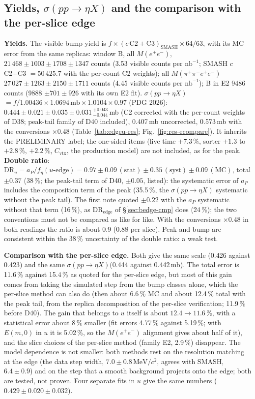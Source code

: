 \documentclass[11pt,a4paper]{article}
\newcommand{\Mfour}{\ensuremath{M(\pi^{+}\pi^{-}e^{+}e^{-})}\xspace}
\newcommand{\Mee}{\ensuremath{M(e^{+}e^{-})}\xspace}
\newcommand{\nbinv}{\ensuremath{\mathrm{nb}^{-1}}\xspace}
\newcommand{\MeVcc}{\ensuremath{\mathrm{MeV}/c^{2}}\xspace}
\newcommand{\code}[1]{\texttt{\detokenize{#1}}}
\newcommand{\aP}{\ensuremath{a_P}\xspace}
\newcommand{\sigeta}{\ensuremath{\sigma(pp\to\eta X)}\xspace}
\begin{document}
\subsection{Yields, \texorpdfstring{\sigeta}{sigma(pp -> eta X)} and the comparison with the per-slice edge}
\label{sec:edgeu-cmp}
\textbf{Yields.} The visible bump yield is $f\times(c\,\mathrm{C2}+\mathrm{C3})_{\mathrm{SMASH}}\times64/63$, with its MC error from the same
replicas: window B, all \Mee, $21\,468\pm1003\pm1708\pm1347$ counts (3.53 visible counts per \nbinv; SMASH $c$C2+C3 $=50\,425.7$ with the
per-count C2 weights); all \Mfour $27\,027\pm1263\pm2150\pm1711$ counts (4.45 visible counts per \nbinv); B in E2 9486 counts (9888 $\pm701\pm926$
with its own E2 fit). \textbf{\sigeta} $=f/1.00436\times1.0694\,\mathrm{mb}\times1.0104\times0.97$ (PDG 2026):
$0.444\pm0.021\pm0.035\pm0.031\,^{+0.043}_{-0.044}$\,mb (C2 corrected with the per-count weights of D38; peak-tail family of D40 included),
0.407\,mb uncorrected, 0.573\,mb with the conversions $\times0.48$ (Table~\ref{tab:edgeu-res}; Fig.~\ref{fig:res-ecompare}). It inherits
the PRELIMINARY label; the one-sided items (live time $+7.3$\,\%, sorter $+1.3$ to $+2.8$\,\%, \code{cor_ok} $+2.2$\,\%, $C_{\mathrm{vtx}}$, the
production model) are not included, as for the peak. \textbf{Double ratio}: $\mathrm{DR}_u=\aP/f_\eta(u\text{-edge})=0.97\pm0.09\,(\mathrm{stat})
\pm0.35\,(\mathrm{syst})\pm0.09\,(\mathrm{MC})$, total $\pm0.37$ (38\,\%; the peak-tail term of D40, $\pm0.05$, listed): the systematic error of
\aP includes the composition term of the peak (35.5\,\%, the \sigeta systematic without the peak tail). The first note quoted $\pm0.22$ with the \aP systematic without that term (16\,\%), as
$\mathrm{DR}_{\mathrm{edge}}$ of \S\ref{sec:bedge-cmp} does (24\,\%); the two conventions must not be compared as like for like. With the
conversions $\times0.48$ in both readings the ratio is about 0.9 (0.88 per slice). Peak and bump are consistent within the 38\,\% uncertainty of the double
ratio: a weak test.

\textbf{Comparison with the per-slice edge.} Both give the same scale (0.426 against 0.423) and the same \sigeta (0.444 against 0.442\,mb). The
total error is 11.6\,\% against 15.4\,\% as quoted for the per-slice edge, but most of this gain comes from taking the simulated step from the bump
classes alone, which the per-slice method can also do (then about 6.6\,\% MC and about 12.4\,\% total with the peak tail, from the replica
decomposition of the per-slice verification; 11.9\,\% before D40). The gain that belongs to $u$ itself is about $12.4\to11.6$\,\%, with a statistical error about 8\,\% smaller (fit errors 4.77\,\% against
5.19\,\%; with $E(m,0)$ in $u$ it is 5.02\,\%, so the \Mee alignment gives about half of it), and the slice choices of the per-slice method
(family E2, 2.9\,\%) disappear. The model dependence is not smaller: both methods rest on the resolution matching at the edge (the data step width,
$7.0\pm0.8$\,\MeVcc, agrees with SMASH, $6.4\pm0.9$) and on the step that a smooth background projects onto the edge; both are tested, not proven.
Four separate fits in $u$ give the same numbers ($0.429\pm0.020\pm0.032$).
\end{document}
